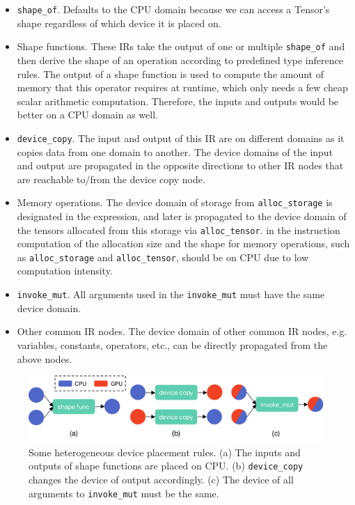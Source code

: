 \begin{itemize}
    \item \verb|shape_of|. Defaults to the CPU domain because we can access a Tensor's shape
                           regardless of which device it is placed on.
    \item Shape functions. These IRs take the output of one or multiple \verb|shape_of| and then derive
                           the shape of an operation according to predefined type inference rules.
                           The output of a shape function is used to compute the amount of memory that this operator
                           requires at runtime, which only needs a few cheap scalar arithmetic computation.
                           Therefore, the inputs and outputs would be better on a CPU domain as well.
    \item \verb|device_copy|. The input and output of this IR are on different domains as it copies data from one domain to another.
                              The device domains of the input and output are propagated in the opposite directions
                                to other IR nodes that are reachable to/from the device copy node.
    \item Memory operations. The device domain of storage from \verb|alloc_storage| is designated in the expression,
          and later is propagated to the device domain of the tensors allocated from this storage via \verb|alloc_tensor|.
          in the instruction computation of the allocation size and the shape for memory operations,
          such as \verb|alloc_storage| and \verb|alloc_tensor|, should be on CPU due to low computation intensity.
    \item \verb|invoke_mut|. All arguments used in the \verb|invoke_mut| must have the same device domain.
    \item Other common IR nodes. The device domain of other common IR nodes,
            e.g. variables, constants, operators, etc., can be directly propagated from the above nodes.
\end{itemize}


\begin{figure}
    \centering
    \includegraphics[width=\linewidth]{figs/hetero.pdf}
    \caption{Some heterogeneous device placement rules. (a) The inputs and outputs of shape functions are placed on CPU.
    (b) \texttt{device\_copy} changes the device of output accordingly.
    (c) The device of all arguments to \texttt{invoke\_mut} must be the same.
    }
    \label{fig:hetero}

\end{figure}

